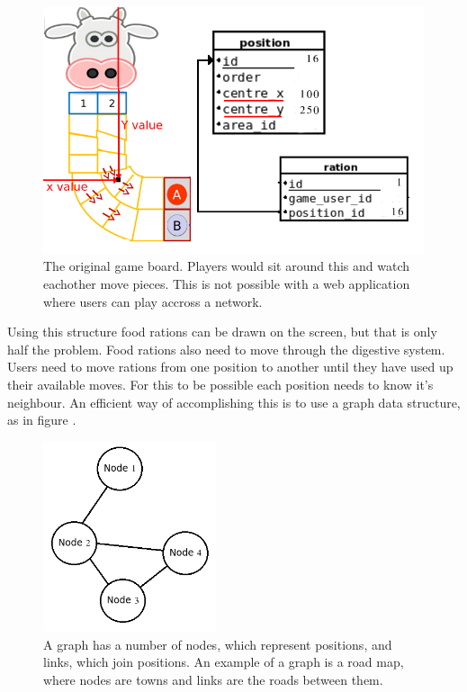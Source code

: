 \begin{figure}[ht]
\centering
\includegraphics[width=6in]{Images/2/detail-1}
\caption{The original game board. Players would sit around this and watch eachother move pieces. This is not possible with a web application where users can play accross a network.}
\label{2_detail_coords}
\end{figure}

Using this structure food rations can be drawn on the screen, but that is only half the problem. Food rations also need to move through the digestive system. Users need to move rations from one position to another until they have used up their available moves. For this to be possible each position needs to know it's neighbour. An efficient way of accomplishing this is to use a graph data structure, as in figure .

\begin{figure}[ht]
\centering
\includegraphics[width=2in]{Images/2/detail-graph}
\caption{A graph has a number of nodes, which represent positions, and links, which join positions. An example of a graph is a road map, where nodes are towns and links are the roads between them.}
\label{2_detail_graph}
\end{figure}

